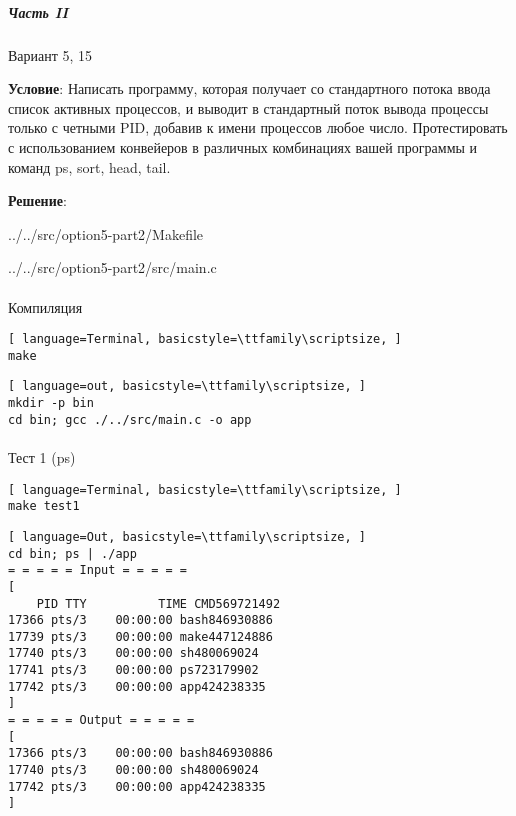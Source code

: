 \subparagraph{Часть II} Вариант 5, 15

\textbf{Условие}:
Написать  программу,  которая  получает  со  стандартного  потока  ввода список активных процессов, и выводит в стандартный поток вывода процессы только с четными PID, добавив к имени процессов любое число. Протестировать с использованием конвейеров в различных комбинациях вашей программы и команд ps, sort, head, tail.

\textbf{Решение}:


{../../src/option5-part2/Makefile}

\newpage


{../../src/option5-part2/src/main.c}

\newpage

\paragraph{}
Компиляция

\begin{lstlisting}[ language=Terminal, basicstyle=\ttfamily\scriptsize, ]
make
\end{lstlisting}

\begin{lstlisting}[ language=out, basicstyle=\ttfamily\scriptsize, ]
mkdir -p bin
cd bin; gcc ./../src/main.c -o app
\end{lstlisting}
    
\paragraph{}
Тест 1 (ps)

\begin{lstlisting}[ language=Terminal, basicstyle=\ttfamily\scriptsize, ]
make test1
\end{lstlisting}

\begin{lstlisting}[ language=Out, basicstyle=\ttfamily\scriptsize, ]
cd bin; ps | ./app
= = = = = Input = = = = =
[
    PID TTY          TIME CMD569721492
17366 pts/3    00:00:00 bash846930886
17739 pts/3    00:00:00 make447124886
17740 pts/3    00:00:00 sh480069024
17741 pts/3    00:00:00 ps723179902
17742 pts/3    00:00:00 app424238335
]
= = = = = Output = = = = =
[
17366 pts/3    00:00:00 bash846930886
17740 pts/3    00:00:00 sh480069024
17742 pts/3    00:00:00 app424238335
]
\end{lstlisting}

